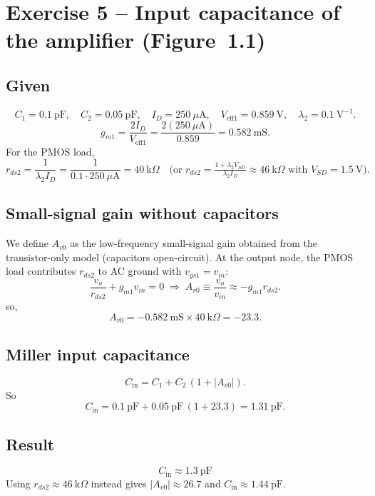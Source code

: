 \documentclass[main.tex]{subfiles}
\begin{document}
\section{Exercise 5 – Input capacitance of the amplifier (Figure~1.1)}

\subsection*{Given}
\[
C_1=0.1~\mathrm{pF}, \quad 
C_2=0.05~\mathrm{pF}, \quad
I_D=250~\mu\mathrm{A}, \quad
V_{\text{eff1}}=0.859~\mathrm{V}, \quad
\lambda_2=0.1~\mathrm{V^{-1}}.
\]
\[
g_{m1}=\frac{2I_D}{V_{\text{eff1}}}
=\frac{2(250~\mu\mathrm{A})}{0.859}
=0.582~\mathrm{mS}.
\]
For the PMOS load,
\[
r_{ds2}=\frac{1}{\lambda_2 I_D}
=\frac{1}{0.1\cdot250~\mu\mathrm{A}}
=40~\mathrm{k}\Omega
\quad
\big(\text{or } r_{ds2}=\tfrac{1+\lambda_2 V_{SD}}{\lambda_2 I_D}\approx 46~\mathrm{k}\Omega \text{ with } V_{SD}=1.5~\mathrm{V}\big).
\]

\subsection*{Small-signal gain without capacitors}
We define \(A_{v0}\) as the low-frequency small-signal gain obtained from the transistor-only model (capacitors open-circuit).  
At the output node, the PMOS load contributes \(r_{ds2}\) to AC ground with \(v_{gs1}=v_{in}\):
\[
\frac{v_o}{r_{ds2}} + g_{m1}v_{in} = 0
\;\Rightarrow\;
A_{v0}\equiv\frac{v_o}{v_{in}} \approx -g_{m1}r_{ds2}.
\]
so,
\[
A_{v0}=-0.582~\mathrm{mS}\times40~\mathrm{k}\Omega=-23.3.
\]

\subsection*{Miller input capacitance}
\[
C_\text{in}=C_1 + C_2\,(1+|A_{v0}|).
\]
So
\[
C_\text{in}=0.1~\mathrm{pF}+0.05~\mathrm{pF}\,(1+23.3)=1.31~\mathrm{pF}.
\]

\subsection*{Result}
\[
\boxed{C_\text{in}\approx 1.3~\mathrm{pF}}
\]
Using \(r_{ds2}\approx 46~\mathrm{k}\Omega\) instead gives \(|A_{v0}|\approx 26.7\) and \(C_\text{in}\approx 1.44~\mathrm{pF}\).
\end{document}
